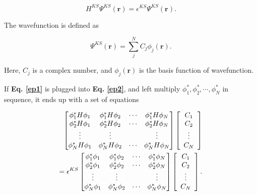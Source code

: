 \documentclass[a4paper, 12pt, titlepage,oneside,drop]{kthesis}
\begin{document}
\begin{equation}\label{ep2}
 H^{KS} \Psi^{KS} (\textbf{r}) = \epsilon^{KS} \Psi^{KS} (\textbf{r}).
\end{equation}
 

The wavefunction is defined as

\begin{equation}\label{ep1}
 \Psi^{KS} (\textbf{r}) = \sum\limits_j^N C_j \phi_j (\textbf{r}).
\end{equation}
 
Here, $C_j$ is a complex number, and $\phi_j (\textbf{r})$ is the basis function of wavefunction. 


If \textbf{Eq. \ref{ep1}} is plugged into \textbf{Eq. \ref{ep2}}, and left multiply $\phi^*_1, \phi^*_2, \cdots, \phi^*_N$ in sequence, it ends up with a set of equations

\begin{equation}\begin{split}\label{ep3}
\left[
\begin{matrix}
    \phi^*_1 {H} \phi_1 & \phi^*_1 {H} \phi_2 & \cdots & \phi^*_1 {H} \phi_N \\
    \phi^*_2 {H} \phi_1 & \phi^*_2 {H} \phi_2 & \cdots & \phi^*_2 {H} \phi_N \\
    \vdots               & \vdots               &        & \vdots               \\
    \phi^*_N {H} \phi_1 & \phi^*_N {H} \phi_2 & \cdots & \phi^*_N {H} \phi_N \\
\end{matrix} \right] \left[ \begin{array}{c} C_1 \\ C_2 \\ \vdots \\ C_N\end{array} \right] \\
= \epsilon^{KS} \left[
\begin{matrix}
   \phi^*_1 \phi_1 & \phi^*_1 \phi_2 & \cdots & \phi^*_1 \phi_N \\
   \phi^*_2 \phi_1 & \phi^*_2 \phi_2 & \cdots & \phi^*_2 \phi_N \\
    \vdots               & \vdots               &        & \vdots               \\
   \phi^*_N \phi_1 & \phi^*_N \phi_2 & \cdots & \phi^*_N \phi_N \\
\end{matrix} \right]\left[ \begin{array}{c} C_1 \\ C_2 \\ \vdots \\ C_N\end{array} \right].
\end{split}\end{equation}
\end{document}

